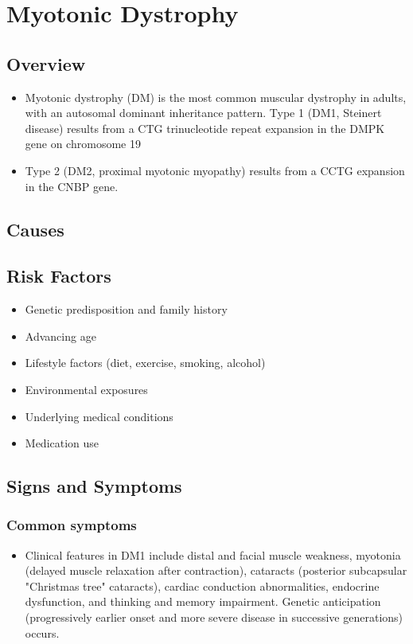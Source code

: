 \chapter{Myotonic Dystrophy}
\label{sec:Myotonic Dystrophy}

\section{Overview}


\begin{itemize}[noitemsep]
  \item Myotonic dystrophy (DM) is the most common muscular dystrophy in adults, with an autosomal dominant inheritance pattern. Type 1 (DM1, Steinert disease) results from a CTG trinucleotide repeat expansion in the DMPK gene on chromosome 19
  \item Type 2 (DM2, proximal myotonic myopathy) results from a CCTG expansion in the CNBP gene.
\end{itemize}
\section{Causes}
\section{Risk Factors}

\begin{itemize}[noitemsep]
  \item Genetic predisposition and family history
  \item Advancing age
  \item Lifestyle factors (diet, exercise, smoking, alcohol)
  \item Environmental exposures
  \item Underlying medical conditions
  \item Medication use
\end{itemize}
\section{Signs and Symptoms}

\subsection{Common symptoms}
\begin{itemize}[noitemsep]
  \item Clinical features in DM1 include distal and facial muscle weakness, myotonia (delayed muscle relaxation after contraction), cataracts (posterior subcapsular "Christmas tree" cataracts), cardiac conduction abnormalities, endocrine dysfunction, and thinking and memory impairment. Genetic anticipation (progressively earlier onset and more severe disease in successive generations) occurs. 
  \end{itemize}

